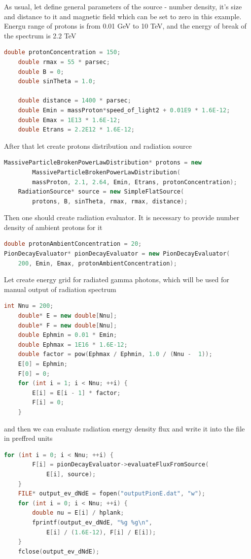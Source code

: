 As usual, let define general parameters of the source - number density, it's size and distance to it and magnetic field which can be set to zero in this example. Energu range of protons is from 0.01 GeV to 10 TeV, and the energy of break of the spectrum is 2.2 TeV
\begin{lstlisting}[language=c++]
	double protonConcentration = 150;
	double rmax = 55 * parsec;
	double B = 0;
	double sinTheta = 1.0;

	double distance = 1400 * parsec;
	double Emin = massProton*speed_of_light2 + 0.01E9 * 1.6E-12;
	double Emax = 1E13 * 1.6E-12;
	double Etrans = 2.2E12 * 1.6E-12;
\end{lstlisting}
After that let create protons distribution and radiation source
\begin{lstlisting}[language=c++]
	MassiveParticleBrokenPowerLawDistribution* protons = new 
		MassiveParticleBrokenPowerLawDistribution(
		massProton, 2.1, 2.64, Emin, Etrans, protonConcentration);
	RadiationSource* source = new SimpleFlatSource(
		protons, B, sinTheta, rmax, rmax, distance);
\end{lstlisting}
Then one should create radiation evaluator. It is necessary to provide number density of ambient protons for it
\begin{lstlisting}[language=c++]
double protonAmbientConcentration = 20;
PionDecayEvaluator* pionDecayEvaluator = new PionDecayEvaluator(
	200, Emin, Emax, protonAmbientConcentration);
\end{lstlisting}
Let create energy grid for radiated gamma photons, which will be used for manual output of radiation spectrum
\begin{lstlisting}[language=c++]
    int Nnu = 200;
    double* E = new double[Nnu];
    double* F = new double[Nnu];
    double Ephmin = 0.01 * Emin;
    double Ephmax = 1E16 * 1.6E-12;
    double factor = pow(Ephmax / Ephmin, 1.0 / (Nnu -  1));
    E[0] = Ephmin;
    F[0] = 0;
    for (int i = 1; i < Nnu; ++i) {
	    E[i] = E[i - 1] * factor;
    	F[i] = 0;
    }
\end{lstlisting}
and then we can evaluate radiation energy density flux and write it into the file in preffred units
\begin{lstlisting}[language=c++]
	for (int i = 0; i < Nnu; ++i) {
		F[i] = pionDecayEvaluator->evaluateFluxFromSource(
		    E[i], source);
	}	
	FILE* output_ev_dNdE = fopen("outputPionE.dat", "w");
	for (int i = 0; i < Nnu; ++i) {
		double nu = E[i] / hplank;
		fprintf(output_ev_dNdE, "%g %g\n",
		    E[i] / (1.6E-12), F[i] / E[i]);
	}
	fclose(output_ev_dNdE);
\end{lstlisting}
